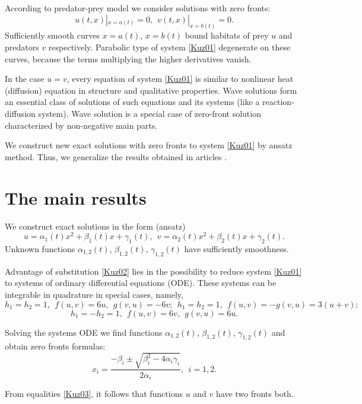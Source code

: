 \documentclass[12pt]{llncs}
\begin{document}
According to predator-prey model \cite{Mur2003} we consider solutions with zero fronts:
$$u(t,x)|_{x=a(t)}=0,~~v(t,x)|_{x=b(t)}=0.$$
Sufficiently smooth curves $x=a(t)$, $x=b(t)$ bound habitats of prey $u$ and predators $v$ respectively. Parabolic type of system \eqref{Kuz01} degenerate on these curves, because the terms multiplying the higher derivatives vanish.

In the case $u=v$, every equation of system \eqref{Kuz01} is similar to nonlinear heat (diffusion) equation\cite{Sam1995} in structure and qualitative properties. Wave solutions form an essential class of solutions of such equations\cite{Sam1995} and its systems (like a reaction-diffusion system\cite{Kaz2020}). Wave solution is a special case of zero-front solution characterized by non-negative main parts.

We construct new exact solutions with zero fronts to system \eqref{Kuz01} by ansatz method. Thus, we generalize the results obtained in articles \cite{Kaz2020,Kuz2022}.

\section{The main results}

We construct exact solutions in the form (ansatz)
\begin{equation}\label{Kuz02}
u=\alpha_1(t)x^2+\beta_1(t)x+\gamma_1(t),~~
v=\alpha_2(t)x^2+\beta_2(t)x+\gamma_2(t).
\end{equation}
Unknown functions $\alpha_{1,2}(t)$, $\beta_{1,2}(t)$, $\gamma_{1,2}(t)$ have sufficiently smoothness.

Advantage of substitution \eqref{Kuz02} lies in the possibility to reduce system \eqref{Kuz01} to systems of ordinary differential equations (ODE). These systems can be integrable in quadrature in special cases, namely,
$$h_1=h_2=1,~~f(u,v)=6u,~~g(v,u)=-6v;~~
h_1=h_2=1,~~f(u,v)=-g(v,u)=3(u+v);$$
$$h_1=-h_2=1,~~f(u,v)=6v,~~g(v,u)=6u.$$

Solving the systems ODE we find functions $\alpha_{1,2}(t)$, $\beta_{1,2}(t)$, $\gamma_{1,2}(t)$ and obtain zero fronts formulas:
\begin{equation}\label{Kuz03}
x_i=\frac{-\beta_i\pm\sqrt{\beta^2_i-4\alpha_i\gamma_i}}{2\alpha_i},~~i=1,2.
\end{equation}

From equalities \eqref{Kuz03}, it follows that functions $u$ and $v$ have two fronts both.
\end{document}
